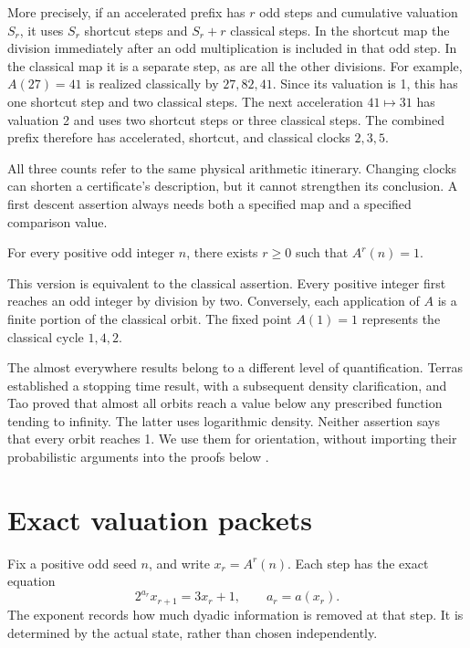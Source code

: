 More precisely, if an accelerated prefix has $r$ odd steps and cumulative valuation $S_r$, it uses $S_r$ shortcut steps and $S_r+r$ classical steps. In the shortcut map the division immediately after an odd multiplication is included in that odd step. In the classical map it is a separate step, as are all the other divisions. For example, $A(27)=41$ is realized classically by $27,82,41$. Since its valuation is 1, this has one shortcut step and two classical steps. The next acceleration $41\mapsto31$ has valuation 2 and uses two shortcut steps or three classical steps. The combined prefix therefore has accelerated, shortcut, and classical clocks $2,3,5$.

All three counts refer to the same physical arithmetic itinerary. Changing clocks can shorten a certificate's description, but it cannot strengthen its conclusion. A first descent assertion always needs both a specified map and a specified comparison value.

\begin{conjecture}[Collatz]\label{conj:collatz}
For every positive odd integer $n$, there exists $r\ge0$ such that $A^r(n)=1$.
\end{conjecture}

This version is equivalent to the classical assertion. Every positive integer first reaches an odd integer by division by two. Conversely, each application of $A$ is a finite portion of the classical orbit. The fixed point $A(1)=1$ represents the classical cycle $1,4,2$.

The almost everywhere results belong to a different level of quantification. Terras established a stopping time result, with a subsequent density clarification, and Tao proved that almost all orbits reach a value below any prescribed function tending to infinity. The latter uses logarithmic density. Neither assertion says that every orbit reaches 1. We use them for orientation, without importing their probabilistic arguments into the proofs below \cite{terras1976,terras1979,tao2026}.

\section{Exact valuation packets}
Fix a positive odd seed $n$, and write $x_r=A^r(n)$. Each step has the exact equation
\begin{equation}\label{eq:onestep}
2^{a_r}x_{r+1}=3x_r+1,\qquad a_r=a(x_r).
\end{equation}
The exponent records how much dyadic information is removed at that step. It is determined by the actual state, rather than chosen independently.

